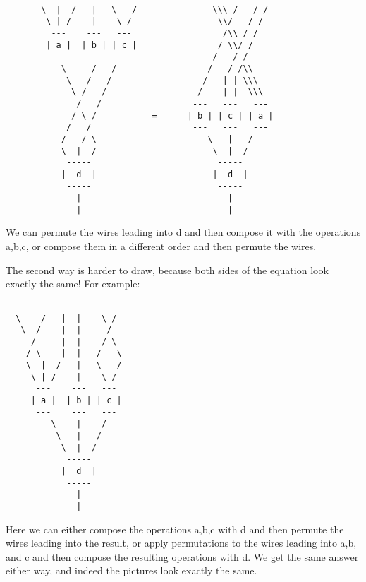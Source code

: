 \begin{verbatim}

       \  |  /   |   \   /               \\\ /   / /
        \ | /    |    \ /                 \\/   / /
         ---    ---   ---                  /\\ / /
        | a |  | b | | c |                / \\/ /
         ---    ---   ---                /   / /
           \     /   /                  /   / /\\
            \   /   /                  /   | | \\\  
             \ /   /                  /    | |  \\\
              /   /                  ---   ---   ---
             / \ /           =      | b | | c | | a |
            /   /                    ---   ---   ---
           /   / \                      \   |   /
           \  |  /                       \  |  /
            -----                         -----
           |  d  |                       |  d  | 
            -----                         -----
              |                             |
              |                             |
\end{verbatim}
    
We can permute the wires leading into d and then compose it with the
operations a,b,c, or compose them in a different order and then
permute the wires.  

The second way is harder to draw, because both sides of the equation
look exactly the same!  For example:


\begin{verbatim}

  \    /   |  |    \ /  
   \  /    |  |     / 
     /     |  |    / \ 
    / \    |  |   /   \
    \  |  /   |   \   /    
     \ | /    |    \ /    
      ---    ---   ---   
     | a |  | b | | c | 
      ---    ---   --- 
         \    |    /
          \   |   /  
           \  |  / 
            ----- 
           |  d  |  
            -----  
              |   
              |  
\end{verbatim}
    
Here we can either compose the operations a,b,c with d and then
permute the wires leading into the result, or apply permutations to
the wires leading into a,b, and c and then compose the resulting
operations with d.  We get the same answer either way, and indeed
the pictures look exactly the same.

